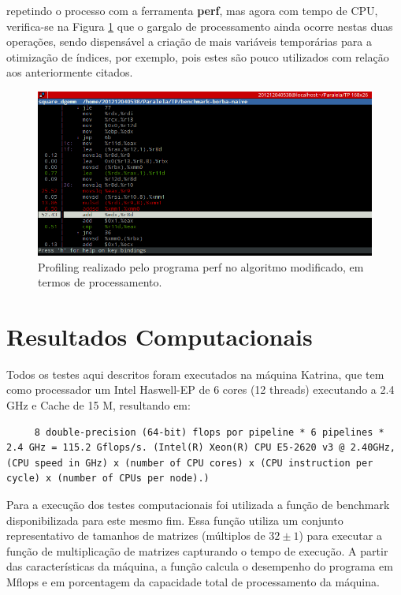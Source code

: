 \documentclass[a4paper,10pt]{article}
\begin{document}
repetindo o processo com a ferramenta \textbf{perf}, mas agora com tempo de CPU, verifica-se na Figura \ref{fig:perf_ops} que o gargalo de processamento ainda ocorre nestas duas operações, sendo dispensável a criação de mais variáveis temporárias para a otimização de índices, por exemplo, pois estes são pouco utilizados com relação aos anteriormente citados.



\begin{figure}[H]
    \begin{center} 
        \includegraphics[scale=0.5]{images/perf_ops}
    \end{center}
    \caption{Profiling realizado pelo programa perf no algoritmo modificado, em termos de processamento.}
    \label{fig:perf_ops}
\end{figure}



  
 \section{Resultados Computacionais}
  
Todos os testes aqui descritos foram executados na máquina Katrina, que tem como processador um Intel Haswell-EP de 6 cores (12 threads) executando a 2.4 GHz e Cache de 15 M, resultando em:
\begin{verbatim}
     8 double-precision (64-bit) flops por pipeline * 6 pipelines * 2.4 GHz = 115.2 Gflops/s. (Intel(R) Xeon(R) CPU E5-2620 v3 @ 2.40GHz, (CPU speed in GHz) x (number of CPU cores) x (CPU instruction per cycle) x (number of CPUs per node).) 
\end{verbatim} 
  
  
Para a execução dos testes computacionais foi utilizada a função de benchmark disponibilizada para este mesmo fim. Essa função utiliza um conjunto representativo de tamanhos de matrizes (múltiplos de $32 \pm 1$) para executar a função de multiplicação de matrizes capturando o tempo de execução. A partir das características da máquina, a função calcula o desempenho do programa em Mflops e em porcentagem da capacidade total de processamento da máquina. 
  
\end{document}
